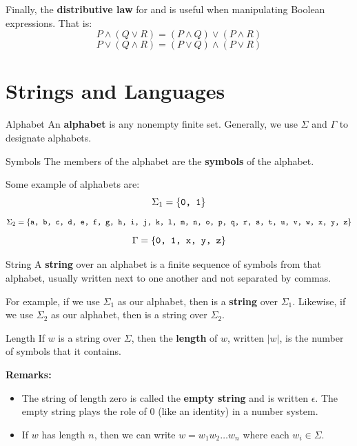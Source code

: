 \documentclass[letterpaper]{article}
\begin{document}
Finally, the \textbf{distributive law} for  and  is useful when manipulating Boolean expressions. That is: 
\[P \land (Q \lor R) = (P \land Q) \lor (P \land R)\]
\[P \lor (Q \land R) = (P \lor Q) \land (P \lor R)\]





\newpage 
\section{Strings and Languages}
\begin{definition}{Alphabet}{}
    An \textbf{alphabet} is any nonempty finite set. Generally, we use $\Sigma$ and $\Gamma$ to designate alphabets.
\end{definition}

\begin{definition}{Symbols}{}
    The members of the alphabet are the \textbf{symbols} of the alphabet.
\end{definition}

Some example of alphabets are: 
\[\Sigma_1 = \{\texttt{0, 1}\}\]
\[\Sigma_2 = \{\texttt{a, b, c, d, e, f, g, h, i, j, k, l, m, n, o, p, q, r, s, t, u, v, w, x, y, z}\}\]
\[\Gamma = \{\texttt{0, 1, x, y, z}\}\]

\begin{definition}{String}{}
    A \textbf{string} over an alphabet is a finite sequence of symbols from that alphabet, usually written next to one another and not separated by commas. 
\end{definition}
For example, if we use $\Sigma_1$ as our alphabet, then  is a \textbf{string} over $\Sigma_1$. Likewise, if we use $\Sigma_2$ as our alphabet, then  is a string over $\Sigma_2$. 

\begin{definition}{Length}{}
    If $w$ is a string over $\Sigma$, then the \textbf{length} of $w$, written $|w|$, is the number of symbols that it contains. 
\end{definition}
\textbf{Remarks:}
\begin{itemize}
    \item The string of length zero is called the \textbf{empty string} and is written $\epsilon$. The empty string plays the role of 0 (like an identity) in a number system.
    \item If $w$ has length $n$, then we can write $w = w_1 w_2 \dots w_n$ where each $w_i \in \Sigma$.
\end{itemize} 
\end{document}
